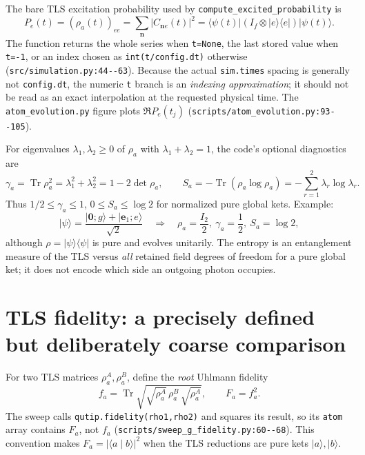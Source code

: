 \documentclass[11pt,a4paper]{article}
\newcommand{\ket}[1]{\lvert #1\rangle}
\newcommand{\bra}[1]{\langle #1\rvert}
\newcommand{\braket}[2]{\langle #1\mid #2\rangle}
\newcommand{\code}[1]{\nolinkurl{#1}}
\newcommand{\Tr}{\operatorname{Tr}}
\begin{document}
The bare TLS excitation probability used by \code{compute_excited_probability} is
\begin{equation}
 P_e(t)=(\rho_a(t))_{ee}=\sum_{\mathbf n}|C_{\mathbf n e}(t)|^2
 =\bra{\psi(t)}(I_f\otimes\ket e\bra e)\ket{\psi(t)}.
 \label{eq:pe}
\end{equation}
The function returns the whole series when \code{t=None}, the last stored value when \code{t=-1}, or an index chosen as \code{int(t/config.dt)} otherwise (\code{src/simulation.py:44--63}). Because the actual \code{sim.times} spacing is generally not \code{config.dt}, the numeric \code{t} branch is an \emph{indexing approximation}; it should not be read as an exact interpolation at the requested physical time. The \code{atom_evolution.py} figure plots $\Re P_e(t_j)$ (\code{scripts/atom_evolution.py:93--105}).

For eigenvalues $\lambda_1,\lambda_2\ge0$ of $\rho_a$ with $\lambda_1+\lambda_2=1$, the code's optional diagnostics are
\begin{equation}
 \gamma_a=\Tr\rho_a^2=\lambda_1^2+\lambda_2^2
 =1-2\det\rho_a,\qquad
 S_a=-\Tr(\rho_a\log\rho_a)=-\sum_{r=1}^2\lambda_r\log\lambda_r.
 \label{eq:ent}
\end{equation}
Thus $1/2\le\gamma_a\le1$, $0\le S_a\le\log2$ for normalized pure global kets. Example:
\begin{equation}
 \ket{\psi}=\frac{\ket{\mathbf0;g}+\ket{\mathbf e_1;e}}{\sqrt2}
 \quad\Longrightarrow\quad
 \rho_a=\frac{I_2}{2},\ \gamma_a=\frac12,\ S_a=\log2,
\end{equation}
although $\rho=\ket\psi\bra\psi$ is pure and evolves unitarily. The entropy is an entanglement measure of the TLS versus \emph{all} retained field degrees of freedom for a pure global ket; it does not encode which side an outgoing photon occupies.

\section{TLS fidelity: a precisely defined but deliberately coarse comparison}
\label{sec:atomfidelity}
For two TLS matrices $\rho_a^A,\rho_a^B$, define the \emph{root} Uhlmann fidelity
\begin{equation}
 f_a=\Tr\sqrt{\sqrt{\rho_a^A}\,\rho_a^B\,\sqrt{\rho_a^A}},
 \qquad F_a=f_a^2.
 \label{eq:fa}
\end{equation}
The sweep calls \code{qutip.fidelity(rho1,rho2)} and squares its result, so its \code{atom} array contains $F_a$, not $f_a$ (\code{scripts/sweep_g_fidelity.py:60--68}). This convention makes $F_a=|\braket{a}{b}|^2$ when the TLS reductions are pure kets $\ket a,\ket b$.
\end{document}
